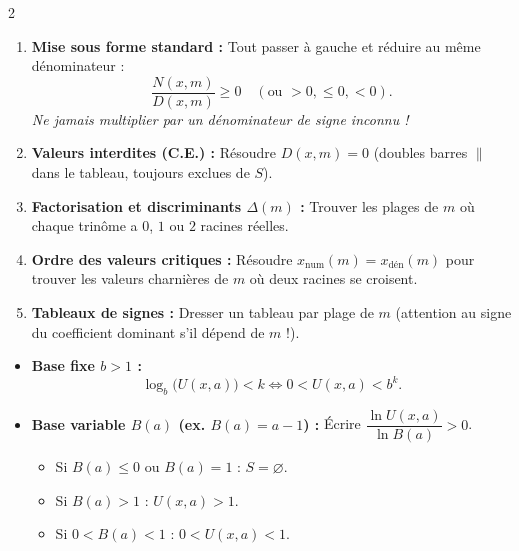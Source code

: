 {\begin{multicols}{2}
\begin{enumerate}[leftmargin=1.4em, itemsep=2pt, topsep=2pt]
    \item \textbf{Mise sous forme standard :} Tout passer à gauche et réduire au même dénominateur :
    \[
        \frac{N(x, m)}{D(x, m)} \ge 0 \quad (\text{ou } > 0, \le 0, < 0).
    \]
    \emph{Ne jamais multiplier par un dénominateur de signe inconnu !}
    \item \textbf{Valeurs interdites (C.E.) :} Résoudre $D(x, m) = 0$ (doubles barres $\|$ dans le tableau, toujours exclues de $S$).
    \item \textbf{Factorisation et discriminants $\Delta(m)$ :} Trouver les plages de $m$ où chaque trinôme a $0$, $1$ ou $2$ racines réelles.
    \item \textbf{Ordre des valeurs critiques :} Résoudre $x_{\text{num}}(m) = x_{\text{dén}}(m)$ pour trouver les valeurs charnières de $m$ où deux racines se croisent.
    \item \textbf{Tableaux de signes :} Dresser un tableau par plage de $m$ (attention au signe du coefficient dominant s'il dépend de $m$ !).
\end{enumerate}

\vspace{3pt}
\begin{itemize}[leftmargin=1.2em, itemsep=1.5pt, topsep=2pt]
    \item \textbf{Base fixe $b > 1$ :}
    \[
        \log_b\bigl(U(x,a)\bigr) < k \iff \boxed{0 < U(x,a) < b^k}.
    \]
    \item \textbf{Base variable $B(a)$ (ex. $B(a) = a - 1$) :}
    Écrire $\dfrac{\ln U(x,a)}{\ln B(a)} > 0$.
    \begin{itemize}[leftmargin=1em, itemsep=1pt]
        \item Si $B(a) \le 0$ ou $B(a) = 1$ : $S = \varnothing$.
        \item Si $B(a) > 1$ : $\boxed{U(x,a) > 1}$.
        \item Si $0 < B(a) < 1$ : $\boxed{0 < U(x,a) < 1}$.
    \end{itemize}
\end{itemize}

\end{multicols}
}

\newpage
\thispagestyle{plain}

